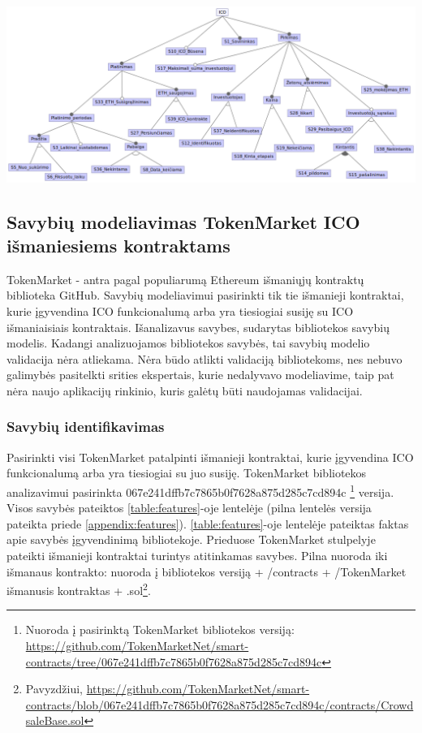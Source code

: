 \documentclass{VUMIFPSbakalaurinis}
\begin{document}
\begin{landscape}

\begin{center}
    \includegraphics[scale=0.7]{img/oz_feature_model}
    \label{img:fm_oz}
\end{center}

\end{landscape}


\subsection{Savybių modeliavimas TokenMarket ICO išmaniesiems kontraktams}

TokenMarket - antra pagal populiarumą Ethereum išmaniųjų kontraktų biblioteka GitHub. Savybių modeliavimui pasirinkti tik tie išmanieji kontraktai, kurie įgyvendina ICO funkcionalumą arba yra tiesiogiai susiję su ICO išmaniaisiais kontraktais. Išanalizavus savybes, sudarytas bibliotekos savybių modelis. Kadangi analizuojamos bibliotekos savybės, tai savybių modelio validacija nėra atliekama. Nėra būdo atlikti validaciją bibliotekoms, nes nebuvo galimybės pasitelkti srities ekspertais, kurie nedalyvavo modeliavime, taip pat nėra naujo aplikacijų rinkinio, kuris galėtų būti naudojamas validacijai.

\subsubsection{Savybių identifikavimas}

Pasirinkti visi TokenMarket patalpinti išmanieji kontraktai, kurie įgyvendina ICO funkcionalumą arba yra tiesiogiai su juo susiję. TokenMarket bibliotekos analizavimui pasirinkta 067e241dffb7c7865b0f7628a875d285c7cd894c \footnote{Nuoroda į pasirinktą TokenMarket bibliotekos versiją: \url{https://github.com/TokenMarketNet/smart-contracts/tree/067e241dffb7c7865b0f7628a875d285c7cd894c}} versija. Visos savybės pateiktos \ref{table:features}-oje lentelėje (pilna lentelės versija pateikta priede \ref{appendix:features}). \ref{table:features}-oje lentelėje pateiktas faktas apie  savybės įgyvendinimą bibliotekoje. Prieduose TokenMarket stulpelyje pateikti išmanieji kontraktai turintys atitinkamas savybes. Pilna nuoroda iki išmanaus kontrakto: nuoroda į bibliotekos versiją + /contracts + /TokenMarket išmanusis kontraktas + .sol\footnote{Pavyzdžiui, \url{https://github.com/TokenMarketNet/smart-contracts/blob/067e241dffb7c7865b0f7628a875d285c7cd894c/contracts/CrowdsaleBase.sol}}.
\end{document}
